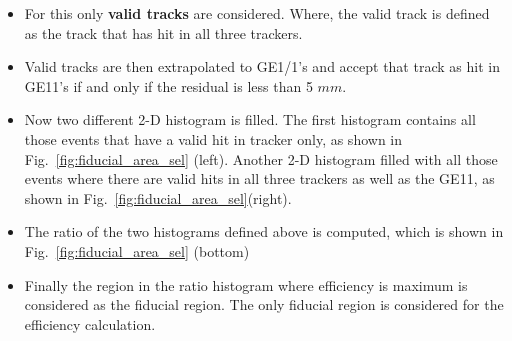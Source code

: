 \begin{itemize}
        \item For this only \textbf{valid tracks} are considered. Where, the valid track is defined as the track that has hit in all three trackers.
        \item Valid tracks are then extrapolated to GE1/1’s and accept that track as hit in GE11’s if and only if the residual is less than 5 $mm$.
        \item Now two different 2-D histogram is filled. The first histogram contains all those events that have a valid hit in tracker only, as shown in Fig.~\ref{fig:fiducial_area_sel} (left). Another 2-D histogram filled with all those events where there are valid hits in all three trackers as well as the GE11, as shown in Fig.~\ref{fig:fiducial_area_sel}(right).
        \item The ratio of the two histograms defined above is computed, which is shown in Fig.~\ref{fig:fiducial_area_sel} (bottom)
        \item Finally the region in the ratio histogram where efficiency is maximum is considered as the fiducial region. The only fiducial region is considered for the efficiency calculation.
\end{itemize}
